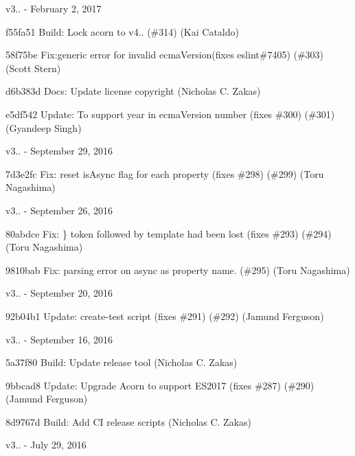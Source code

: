 v3.. -\/ February 2, 2017


\begin{DoxyItemize}
\item f55fa51 Build\+: Lock acorn to v4.. (\#314) (Kai Cataldo)
\item 58f75be Fix\+:generic error for invalid ecma\+Version(fixes eslint\#7405) (\#303) (Scott Stern)
\item d6b383d Docs\+: Update license copyright (Nicholas C. Zakas)
\item e5df542 Update\+: To support year in ecma\+Version number (fixes \#300) (\#301) (Gyandeep Singh)
\end{DoxyItemize}

v3.. -\/ September 29, 2016


\begin{DoxyItemize}
\item 7d3e2fc Fix\+: reset {\ttfamily is\+Async} flag for each property (fixes \#298) (\#299) (Toru Nagashima)
\end{DoxyItemize}

v3.. -\/ September 26, 2016


\begin{DoxyItemize}
\item 80abdce Fix\+: {\ttfamily \}} token followed by template had been lost (fixes \#293) (\#294) (Toru Nagashima)
\item 9810bab Fix\+: parsing error on {\ttfamily async} as property name. (\#295) (Toru Nagashima)
\end{DoxyItemize}

v3.. -\/ September 20, 2016


\begin{DoxyItemize}
\item 92b04b1 Update\+: create-\/test script (fixes \#291) (\#292) (Jamund Ferguson)
\end{DoxyItemize}

v3.. -\/ September 16, 2016


\begin{DoxyItemize}
\item 5a37f80 Build\+: Update release tool (Nicholas C. Zakas)
\item 9bbcad8 Update\+: Upgrade Acorn to support E\+S2017 (fixes \#287) (\#290) (Jamund Ferguson)
\item 8d9767d Build\+: Add CI release scripts (Nicholas C. Zakas)
\end{DoxyItemize}

v3.. -\/ July 29, 2016


